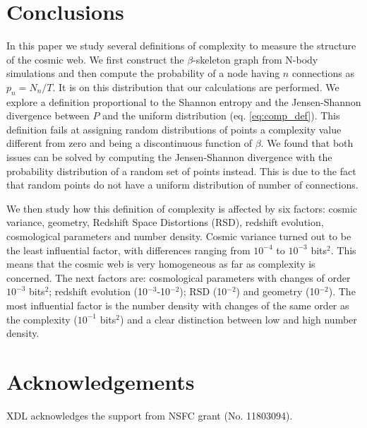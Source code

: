 \documentclass[fleqn,usenatbib]{mnras}
\begin{document}
\section{Conclusions}

In this paper we study several definitions of complexity to measure the structure of the cosmic web. We first construct the $\beta$-skeleton graph from N-body simulations and then compute the probability of a node having $n$ connections as $p_{n}=N_{n}/T$. It is on this distribution that our calculations are performed. We explore a definition proportional to the Shannon entropy and the Jensen-Shannon divergence between $P$ and the uniform distribution (eq. \ref{eq:comp_def}). This definition fails at assigning random distributions of points a complexity value different from zero and being a discontinuous function of $\beta$. We found that both issues can be solved by computing the Jensen-Shannon divergence with the probability distribution of a random set of points instead. This is due to the fact that random points do not have a uniform distribution of number of connections. 

We then study how this definition of complexity is affected by six
factors: cosmic variance, geometry, Redshift Space Distortions (RSD),
redshift evolution, cosmological parameters and number density. Cosmic
variance turned out to be the least influential factor, with
differences ranging from $10^{-4}$ to $10^{-3}$ bits$^2$. This means
that the cosmic web is very homogeneous as far as complexity is
concerned. The next factors are: cosmological parameters with changes
of order $10^{-3}$ bits$^2$; redshift evolution (10$^{-3}$-10$^{-2}$);
RSD (10$^{-2}$) and geometry (10$^{-2}$). The most influential factor
is the number density with changes of the same order as the complexity
($10^{-1}$ bits$^2$) and a clear distinction between low and high
number density.  

\section*{Acknowledgements}
XDL acknowledges the support from NSFC grant (No. 11803094).






\end{document}
